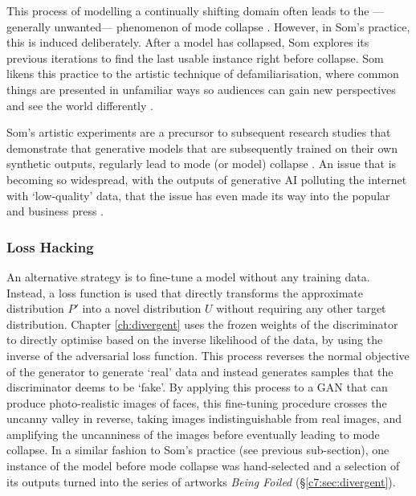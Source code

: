 This process of modelling a continually shifting domain often leads to the ---generally unwanted--- phenomenon of mode collapse \citep{thanh2020catastrophic}. 
However, in Som's practice, this is induced deliberately. After a model has collapsed, Som explores its previous iterations to find the last usable instance right before collapse. 
Som likens this practice to the artistic technique of defamiliarisation, where common things are presented in unfamiliar ways so audiences can gain new perspectives and see the world differently \citep{som2021personal}.

Som's artistic experiments are a precursor to subsequent research studies that demonstrate that generative models that are subsequently trained on their own synthetic outputs, regularly lead to mode (or model) collapse \citep{alemohammad2023self, martinez2023combining, shumailov2023curse, shumailov2024ai}. An issue that is becoming so widespread, with the outputs of generative AI polluting the internet with `low-quality' data, that the issue has even made its way into the popular and business press \citep{peel2024problem,aatish2024threat}.

\subsubsection{Loss Hacking} 

An alternative strategy is to fine-tune a model without any training data. 
Instead, a loss function is used that directly transforms the approximate distribution $P'$ into a novel distribution $U$ without requiring any other target distribution. 
Chapter \ref{ch:divergent} uses the frozen weights of the discriminator to directly optimise based on the inverse likelihood of the data, by using the inverse of the adversarial loss function. 
This process reverses the normal objective of the generator to generate `real' data and instead generates samples that the discriminator deems to be `fake'. 
By applying this process to a GAN that can produce photo-realistic images of faces, this fine-tuning procedure crosses the uncanny valley in reverse, taking images indistinguishable from real images, and amplifying the uncanniness of the images before eventually leading to mode collapse. 
In a similar fashion to Som's practice (see previous sub-section), one instance of the model before mode collapse was hand-selected and a selection of its outputs turned into the series of artworks \textit{Being Foiled} \citep{broad2020being} (\S \ref{c7:sec:divergent}).

